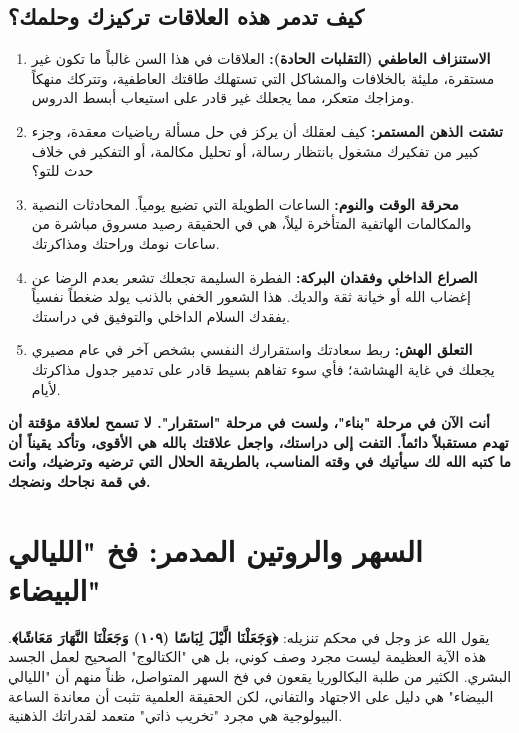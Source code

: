 \documentclass[12pt,a4paper]{book}
\newcommand{\importantAr}[1]{%
	\begin{important}
		\bfseries #1
	\end{important}
}
\begin{document}
	\subsection*{كيف تدمر هذه العلاقات تركيزك وحلمك؟}
	\begin{enumerate}
		\item \textbf{الاستنزاف العاطفي (التقلبات الحادة):} العلاقات في هذا السن غالباً ما تكون غير مستقرة، مليئة بالخلافات والمشاكل التي تستهلك طاقتك العاطفية، وتتركك منهكاً ومزاجك متعكر، مما يجعلك غير قادر على استيعاب أبسط الدروس.
		\item \textbf{تشتت الذهن المستمر:} كيف لعقلك أن يركز في حل مسألة رياضيات معقدة، وجزء كبير من تفكيرك مشغول بانتظار رسالة، أو تحليل مكالمة، أو التفكير في خلاف حدث للتو؟ 
		\item \textbf{محرقة الوقت والنوم:} الساعات الطويلة التي تضيع يومياً.  المحادثات النصية والمكالمات الهاتفية المتأخرة ليلاً، هي في الحقيقة رصيد \newline مسروق مباشرة من ساعات نومك وراحتك ومذاكرتك.
		\item \textbf{الصراع الداخلي وفقدان البركة:} الفطرة السليمة تجعلك تشعر بعدم الرضا عن إغضاب الله أو خيانة ثقة والديك. هذا الشعور الخفي بالذنب يولد ضغطاً نفسياً يفقدك السلام الداخلي والتوفيق في دراستك.
		\item \textbf{التعلق الهش:} ربط سعادتك واستقرارك النفسي بشخص آخر في عام مصيري يجعلك في غاية الهشاشة؛ فأي سوء تفاهم بسيط قادر على تدمير جدول مذاكرتك لأيام.
	\end{enumerate}
	
	\importantAr{أنت الآن في مرحلة "بناء"، ولست في مرحلة "استقرار". لا تسمح لعلاقة مؤقتة أن تهدم مستقبلاً دائماً. التفت إلى دراستك، واجعل علاقتك بالله هي الأقوى، وتأكد يقيناً أن ما كتبه الله لك سيأتيك في وقته المناسب، بالطريقة الحلال التي ترضيه وترضيك، وأنت في قمة نجاحك ونضجك.}
	
	\section{السهر والروتين المدمر: فخ "الليالي البيضاء"}
	
	يقول الله عز وجل في محكم تنزيله: \textbf{﴿وَجَعَلْنَا الَّيْلَ لِبَاسًا (١٠٩) وَجَعَلْنَا النَّهَارَ مَعَاشًا﴾}. هذه الآية العظيمة ليست مجرد وصف كوني، بل هي "الكتالوج" الصحيح لعمل الجسد البشري. الكثير من طلبة البكالوريا يقعون في فخ السهر المتواصل، ظناً منهم أن "الليالي البيضاء" هي دليل على الاجتهاد والتفاني، لكن الحقيقة العلمية تثبت أن معاندة الساعة البيولوجية هي مجرد "تخريب ذاتي" متعمد لقدراتك الذهنية.
	
\end{document}
